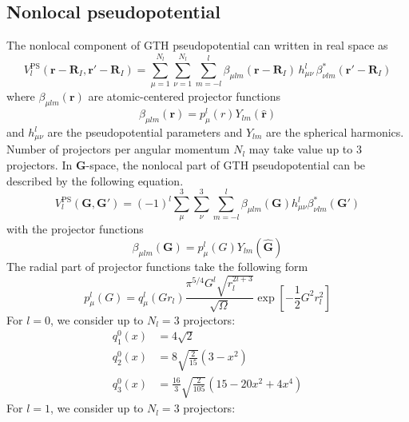 \subsection{Nonlocal pseudopotential}



The nonlocal component of GTH pseudopotential can written in real space as
\begin{equation}
V^{\mathrm{PS}}_{l}(\mathbf{r}-\mathbf{R}_{I},\mathbf{r}'-\mathbf{R}_{I}) =
\sum_{\mu=1}^{N_{l}} \sum_{\nu=1}^{N_{l}} \sum_{m=-l}^{l}
\beta_{\mu lm}(\mathbf{r}-\mathbf{R}_{I})\,
h^{l}_{\mu\nu}\,
\beta^{*}_{\nu lm}(\mathbf{r}'-\mathbf{R}_{I})
\end{equation}
where $\beta_{\mu lm}(\mathbf{r})$ are atomic-centered projector functions
\begin{equation}
\beta_{\mu lm}(\mathbf{r}) =
p^{l}_{\mu}(r) Y_{lm}(\hat{\mathbf{r}})
\label{eq:proj_NL_R}
\end{equation}
%
and $h^{l}_{\mu\nu}$ are the pseudopotential parameters and
$Y_{lm}$ are the spherical harmonics. Number of projectors per angular
momentum $N_{l}$ may take value up to 3 projectors.
%
In $\mathbf{G}$-space, the nonlocal part of GTH pseudopotential can be described by
the following equation.
\begin{equation}
V^{\mathrm{PS}}_{l}(\mathbf{G},\mathbf{G}') =
(-1)^{l} \sum_{\mu}^{3} \sum_{\nu}^{3}\sum_{m=-l}^{l}
\beta_{\mu l m}(\mathbf{G}) h^{l}_{\mu\nu}
\beta^{*}_{\nu l m}(\mathbf{G}')
\end{equation}
with the projector functions
\begin{equation}
\beta_{\mu lm}(\mathbf{G}) = p^{l}_{\mu}(G) Y_{lm}(\hat{\mathbf{G}})
\label{eq:betaNL_G}
\end{equation}
The radial part of projector functions take the following form
\begin{equation}
p^{l}_{\mu}(G) = q^{l}_{\mu}\left(Gr_{l}\right)
\frac{\pi^{5/4}G^{l}\sqrt{ r_{l}^{2l+3}}}{\sqrt{\Omega}}
\exp\left[-\frac{1}{2}G^{2}r^{2}_{l}\right]
\label{eq:proj_NL_G}
\end{equation}
%
For $l=0$, we consider up to $N_{l}=3$ projectors:
\begin{align}
q^{0}_{1}(x) & = 4\sqrt{2} \\
q^{0}_{2}(x) & = 8\sqrt{\frac{2}{15}}(3 - x^2) \\
q^{0}_{3}(x) & = \frac{16}{3}\sqrt{\frac{2}{105}} (15 - 20x^2 + 4x^4)
\end{align}
%
For $l=1$, we consider up to $N_{l}=3$ projectors:
